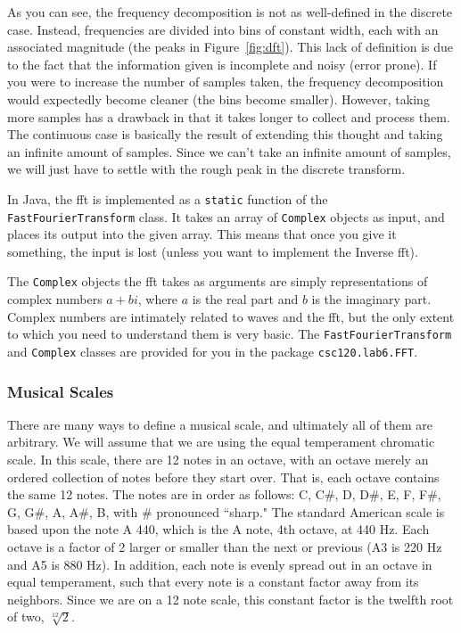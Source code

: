 As you can see, the frequency decomposition is not as well-defined in the discrete case.
Instead, frequencies are divided into bins of constant width, each with an associated magnitude (the peaks in Figure~\ref{fig:dft}).
This lack of definition is due to the fact that the information given is incomplete and noisy (error prone).
If you were to increase the number of samples taken, the frequency decomposition would expectedly become cleaner (the bins become smaller).
However, taking more samples has a drawback in that it takes longer to collect and process them.
The continuous case is basically the result of extending this thought and taking an infinite amount of samples.
Since we can't take an infinite amount of samples, we will just have to settle with the rough peak in the discrete transform.

In Java, the \ac{fft} is implemented as a \verb=static= function of the {\tt FastFourierTransform} class.
It takes an array of \verb=Complex= objects as input, and places its output into the given array.
This means that once you give it something, the input is lost (unless you want to implement the Inverse \ac{fft}).

The \verb=Complex= objects the \ac{fft} takes as arguments are simply representations of complex numbers $a+bi$, where $a$ is the real part and $b$ is the imaginary part.
Complex numbers are intimately related to waves and the \ac{fft}, but the only extent to which you need to understand them is very basic.
The \verb=FastFourierTransform= and \verb=Complex= classes are provided for you in the package {\tt csc120.lab6.FFT}.

\subsubsection{Musical Scales}
There are many ways to define a musical scale, and ultimately all of them are arbitrary.
We will assume that we are using the equal temperament chromatic scale.
In this scale, there are 12 notes in an octave, with an octave merely an ordered collection of notes before they start over.
That is, each octave contains the same 12 notes.
The notes are in order as follows: C, C\#, D, D\#, E, F, F\#, G, G\#, A, A\#, B, with \# pronounced ``sharp."
The standard American scale is based upon the note A 440, which is the A note, 4th octave, at 440 Hz.
Each octave is a factor of 2 larger or smaller than the next or previous (A3 is 220 Hz and A5 is 880 Hz).
In addition, each note is evenly spread out in an octave in equal temperament, such that every note is a constant factor away from its neighbors.
Since we are on a 12 note scale, this constant factor is the twelfth root of two, $ \sqrt[12]{2}$.

